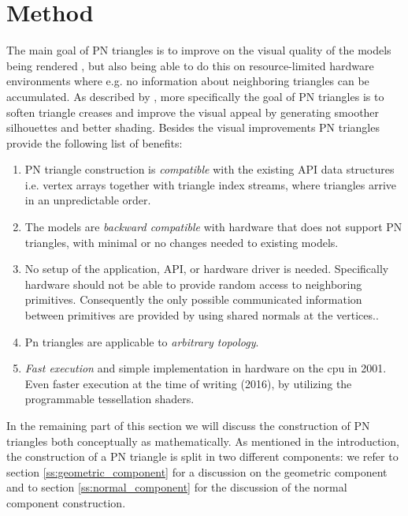 
\section{Method}
\label{s:method}


The main goal of PN triangles is to improve on the visual quality of the models being rendered , but also being able to do this on resource-limited hardware environments where e.g. no information about neighboring triangles can be accumulated. As described by \citeauthor{vlachos2001curved}, more specifically the goal of PN triangles is to soften triangle creases and improve the visual appeal by generating smoother silhouettes and better shading. Besides the visual improvements PN triangles provide the following list of benefits:

\begin{enumerate}
 	\item PN triangle construction is \textit{compatible} with the existing API data structures i.e. vertex arrays together with triangle index streams, where triangles arrive in an unpredictable order.
 	\item The models are \textit{backward compatible} with hardware that does not support PN triangles, with minimal or no changes needed to existing models.
 	\item No setup of the application, API, or hardware driver is needed. Specifically hardware should not be able to provide random access to neighboring primitives. Consequently the only possible communicated information between primitives are provided by using shared normals at the vertices..
 	\item Pn triangles are applicable to \textit{arbitrary topology}.
 	\item \textit{Fast execution} and simple implementation in hardware on the cpu in 2001. Even faster execution at the time of writing (2016), by utilizing the programmable tessellation shaders.
 \end{enumerate} 

In the remaining part of this section we will discuss the construction of PN triangles both conceptually as mathematically. As mentioned in the introduction, the construction of a PN triangle is split in two different components: we refer to section \ref{ss:geometric_component} for a discussion on the geometric component and to section \ref{ss:normal_component} for the discussion of the normal component construction.

